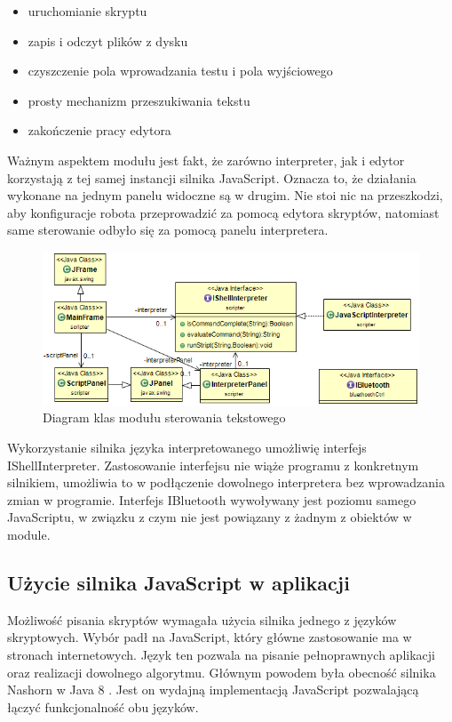 \documentclass[eng,printmode]{mgr}
\begin{document}
\begin{itemize}
 \item uruchomianie skryptu
 \item zapis i odczyt plików z dysku
 \item czyszczenie pola wprowadzania testu i pola wyjściowego
 \item prosty mechanizm przeszukiwania tekstu
 \item zakończenie pracy edytora
\end{itemize}

Ważnym aspektem modułu jest fakt, że zarówno interpreter, jak i edytor korzystają z tej samej instancji silnika JavaScript. Oznacza to, że działania wykonane na jednym panelu widoczne są w drugim. Nie stoi nic na przeszkodzi, aby konfiguracje robota przeprowadzić za pomocą edytora skryptów, natomiast same sterowanie odbyło się za pomocą panelu interpretera.

   \begin{figure}[ht]
    \centering
    \includegraphics[width=1\textwidth]{images/script}
    \caption{Diagram klas modułu sterowania tekstowego }
    \label{fig:script}
   \end{figure}

Wykorzystanie silnika języka interpretowanego umożliwię interfejs IShellInterpreter. Zastosowanie interfejsu nie wiąże programu z konkretnym silnikiem, umożliwia to w podłączenie dowolnego interpretera bez wprowadzania zmian w programie. Interfejs IBluetooth wywoływany jest poziomu samego JavaScriptu, w związku z czym nie jest powiązany z żadnym z obiektów w module.   

   \subsection{Użycie silnika JavaScript w aplikacji}

Możliwość pisania skryptów wymagała użycia silnika jednego z języków skryptowych. Wybór padł na JavaScript, który główne zastosowanie ma w stronach internetowych. Język ten pozwala na pisanie pełnoprawnych aplikacji oraz realizacji dowolnego algorytmu. Głównym powodem była obecność silnika Nashorn w Java 8 . Jest on wydajną implementacją JavaScript pozwalającą łączyć funkcjonalność obu języków. 
\end{document}
